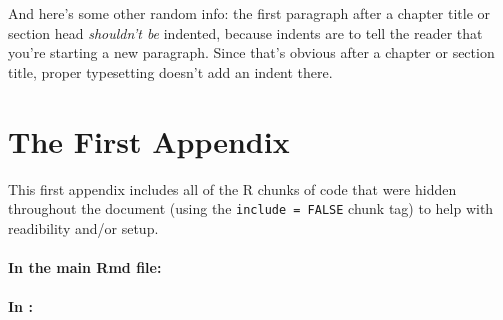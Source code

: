 \documentclass[12pt,twoside]{reedthesis}
\begin{document}
  And here's some other random info: the first paragraph after a chapter
  title or section head \emph{shouldn't be} indented, because indents are
  to tell the reader that you're starting a new paragraph. Since that's
  obvious after a chapter or section title, proper typesetting doesn't add
  an indent there.
  
  \appendix
  
  \chapter{The First Appendix}\label{the-first-appendix}
  
  This first appendix includes all of the R chunks of code that were
  hidden throughout the document (using the \texttt{include\ =\ FALSE}
  chunk tag) to help with readibility and/or setup.
  
  \subsubsection{In the main Rmd file:}\label{in-the-main-rmd-file}
  
  \begin{Shaded}
  \begin{Highlighting}[]
    \NormalTok{(}\NormalTok{, } \NormalTok{)}
    \NormalTok{(}\NormalTok{)}
  \NormalTok{\}}
  \end{Highlighting}
  \end{Shaded}
  
  \subsubsection{\texorpdfstring{In
  \protect\hyperlink{ref_labels}{}:}{In :}}\label{in}
  
\end{document}
